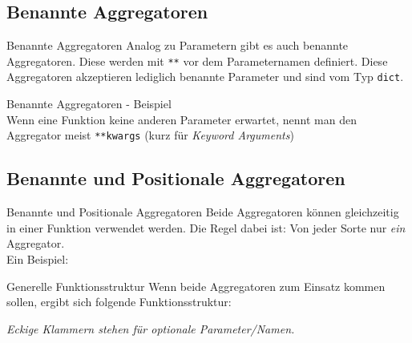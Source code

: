 \subsection{Benannte Aggregatoren}
\begin{frame}[fragile]{Benannte Aggregatoren}
  Analog zu Parametern gibt es auch benannte Aggregatoren. Diese werden mit \texttt{**}
  vor dem Parameternamen definiert. Diese Aggregatoren akzeptieren lediglich
  benannte Parameter und sind vom Typ \texttt{dict}.
\end{frame}

\begin{frame}[fragile]{Benannte Aggregatoren - Beispiel}
   \ \\[.75cm]
  Wenn eine Funktion keine anderen Parameter erwartet, nennt man den Aggregator meist
  \texttt{**kwargs} (kurz für \textit{Keyword Arguments})
\end{frame}


\subsection{Benannte und Positionale Aggregatoren}
\begin{frame}{Benannte und Positionale Aggregatoren}
  Beide Aggregatoren können gleichzeitig in einer Funktion verwendet werden.
  Die Regel dabei ist: Von jeder Sorte nur \textit{ein} Aggregator. \\[.5cm]
  Ein Beispiel:
  
\end{frame}

\begin{frame}{Generelle Funktionsstruktur}
  Wenn beide Aggregatoren zum Einsatz kommen sollen, ergibt sich folgende Funktionsstruktur:
  
  \textit{Eckige Klammern stehen für optionale Parameter/Namen.}
\end{frame}


